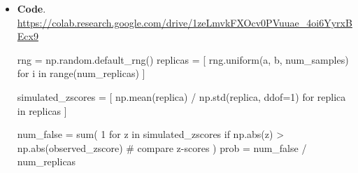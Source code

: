 \documentclass[../main.tex]{subfiles}
\begin{document}
\begin{example}
\begin{itemize}[wide]
    \item \textbf{Code}. \url{https://colab.research.google.com/drive/1zeLmvkFXOcv0PVuuae_4oi6YyrxBEcx9}

      \begin{pythoncode}
rng = np.random.default_rng()
replicas = [
    rng.uniform(a, b, num_samples)
    for i in range(num_replicas)
]

simulated_zscores = [
    np.mean(replica) / np.std(replica, ddof=1)
    for replica in replicas
]

num_false = sum(
    1
    for z in simulated_zscores
    if np.abs(z) > np.abs(observed_zscore) # compare z-scores
)
prob = num_false / num_replicas
      \end{pythoncode}
  \end{itemize}
\end{example}
\end{document}
